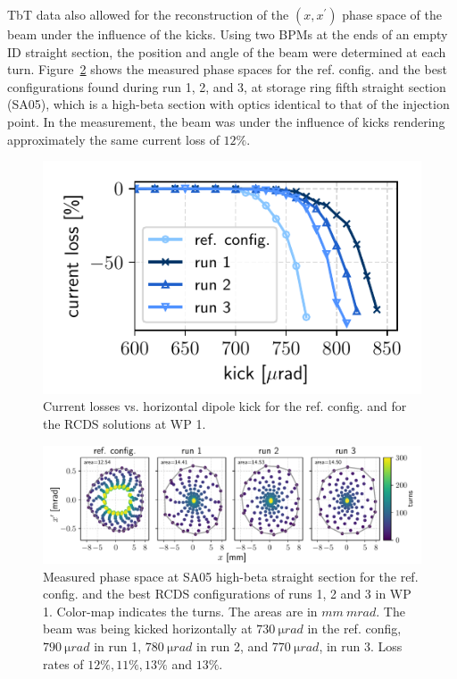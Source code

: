 TbT data also allowed for the reconstruction of the $(x,x^\prime)$ phase space of the beam under the influence of the kicks. Using two BPMs at the ends of an empty ID straight section, the position and angle of the beam were determined at each turn. Figure~\ref{fig:oldtunes_phase} shows the measured phase spaces for the ref. config. and the best configurations found during run 1, 2, and 3, at storage ring fifth straight section (SA05), which is a high-beta section with optics identical to that of the injection point. In the measurement, the beam was under the influence of kicks rendering approximately the same current loss of $12\%$.
\begin{figure}[tb]
    \centering
    \includegraphics[width=0.6\columnwidth]{Images/WEPL087_f1.pdf}
    \caption{Current losses vs. horizontal dipole kick for the ref. config. and for the RCDS solutions at WP 1.}
       \label{fig:loss_kicks}
\end{figure}
\begin{figure}[tb]
    \centering
        \includegraphics[width=\textwidth]{Images/WEPL087_f2.pdf}
        \caption{Measured phase space at SA05 high-beta straight section for the ref. config. and the best RCDS configurations of runs 1, 2 and 3 in WP 1. Color-map indicates the turns. The areas are in $\unit{mm}~\unit{mrad}$. The beam was being kicked horizontally at $730~\unit{\micro rad}$ in the ref. config, $790~\unit{\micro rad}$ in run 1, $780~\unit{\micro rad}$ in run 2, and $770~\unit{\micro rad}$, in run 3. Loss rates of  $12\%, 11\%, 13\%$ and $13\%$.}
        \label{fig:oldtunes_phase}
\end{figure}

